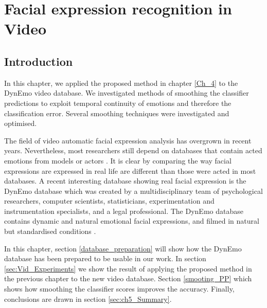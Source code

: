 \chapter{Facial expression recognition in Video}
\minitoc


\section{Introduction}
In this chapter, we applied the proposed method in chapter \ref{Ch_4} to the DynEmo video database. We investigated methods of smoothing the classifier predictions to exploit temporal continuity of emotions and therefore the classification error. Several smoothing techniques were investigated and optimised.

The field of video automatic facial expression analysis has overgrown in recent years. Nevertheless, most researchers still depend on databases that contain acted emotions from models or actors \citep{dhall2013emotion,dhall2014emotion,dhall2015video,dhall2016emotiw}. It is clear by comparing the way facial expressions are expressed in real life are different than those were acted in most databases. 
A recent interesting database showing real facial expression is the DynEmo database \citep{tcherkassof2013dynemo} which was created by a multidisciplinary team of psychological researchers, computer scientists, statisticians, experimentation and instrumentation specialists, and a legal professional. The DynEmo database contains dynamic and natural emotional facial expressions, and filmed in natural but standardised conditions \citep{tcherkassof2013dynemo}. 




In this chapter, section \ref {database_preparation}  will show how the DynEmo database has been prepared to be usable in our work. In section  \ref{sec:Vid_Experiments} we show the result of applying the proposed method in the previous chapter to the new video database. Section \ref{smooting_PP} which shows how smoothing the classifier scores improves the accuracy.  Finally, conclusions are drawn in section \ref{sec:ch5_Summary}. 

